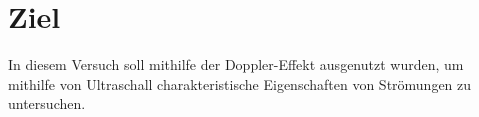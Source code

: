 \section{Ziel}
\label{sec:Ziel}
In diesem Versuch soll mithilfe der Doppler-Effekt ausgenutzt wurden, um mithilfe
von Ultraschall charakteristische Eigenschaften von Strömungen zu untersuchen.
